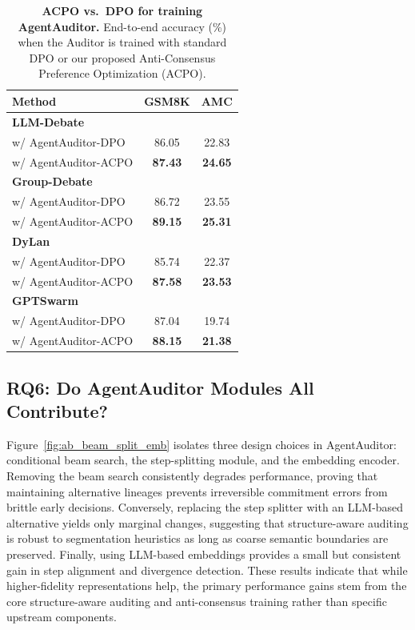 \documentclass{article}
\theoremstyle{plain}
\theoremstyle{definition}
\theoremstyle{remark}
\begin{document}
\begin{table}[t]
\centering
\small
\setlength{\tabcolsep}{6pt}
\renewcommand{\arraystretch}{1.0}
\caption{\textbf{ACPO vs.\ DPO for training AgentAuditor.} End-to-end accuracy (\%) when the Auditor is trained with standard DPO or our proposed Anti-Consensus Preference Optimization (ACPO).}
\label{tab:AgentAuditor_learnable}
\begin{tabular}{lcc}
\textbf{Method} & \textbf{GSM8K} & \textbf{AMC} \\
\toprule
\textbf{LLM-Debate}\\
\quad w/ AgentAuditor-DPO & 86.05 & 22.83 \\
\quad \cellcolor{graybg}w/ AgentAuditor-ACPO & \cellcolor{graybg}\textbf{87.43} & \cellcolor{graybg}\textbf{24.65} \\
\midrule
\textbf{Group-Debate} \\
\quad w/ AgentAuditor-DPO & 86.72 & 23.55 \\
\quad \cellcolor{graybg}w/ AgentAuditor-ACPO & \cellcolor{graybg}\textbf{89.15} & \cellcolor{graybg}\textbf{25.31} \\
\midrule
\textbf{DyLan} \\
\quad w/ AgentAuditor-DPO & 85.74 & 22.37 \\
\quad \cellcolor{graybg}w/ AgentAuditor-ACPO & \cellcolor{graybg}\textbf{87.58} & \cellcolor{graybg}\textbf{23.53} \\
\midrule
\textbf{GPTSwarm}\\
\quad w/ AgentAuditor-DPO & 87.04 & 19.74 \\
\quad \cellcolor{graybg}w/ AgentAuditor-ACPO & \cellcolor{graybg}\textbf{88.15} & \cellcolor{graybg}\textbf{21.38} \\
\bottomrule
\end{tabular}
\end{table}



\subsection{RQ6: Do AgentAuditor Modules All Contribute?}

Figure~\ref{fig:ab_beam_split_emb} isolates three design choices in AgentAuditor: conditional beam search, the step-splitting module, and the embedding encoder. Removing the beam search consistently degrades performance, proving that maintaining alternative lineages prevents irreversible commitment errors from brittle early decisions. Conversely, replacing the step splitter with an LLM-based alternative yields only marginal changes, suggesting that structure-aware auditing is robust to segmentation heuristics as long as coarse semantic boundaries are preserved. Finally, using LLM-based embeddings provides a small but consistent gain in step alignment and divergence detection. These results indicate that while higher-fidelity representations help, the primary performance gains stem from the core structure-aware auditing and anti-consensus training rather than specific upstream components.
\end{document}
